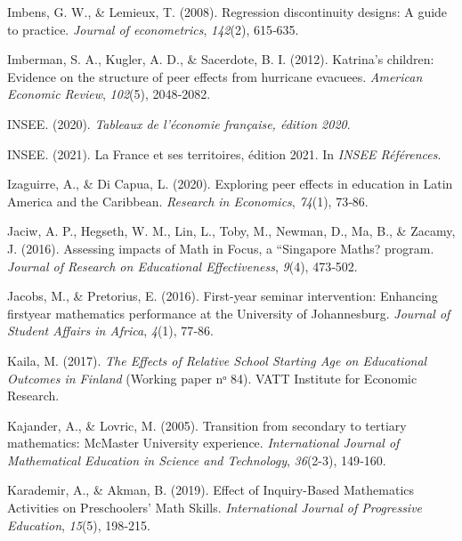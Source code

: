 \documentclass[
]{book}
\newlength{\cslhangindent}
\newlength{\cslentryspacingunit} %
\newenvironment{CSLReferences}[2] %
 {%
  \setlength{\parindent}{0pt}
  \ifodd #1
  \let\oldpar\par
  \def\par{\hangindent=\cslhangindent\oldpar}
  \fi
  \setlength{\parskip}{#2\cslentryspacingunit}
 }%
 {}
\begin{document}
\begin{CSLReferences}{1}{2}
\leavevmode{}%
Imbens, G. W., \& Lemieux, T. (2008). Regression discontinuity designs: A guide to practice. \emph{Journal of econometrics}, \emph{142}(2), 615‑635.

\leavevmode{}%
Imberman, S. A., Kugler, A. D., \& Sacerdote, B. I. (2012). Katrina's children: Evidence on the structure of peer effects from hurricane evacuees. \emph{American Economic Review}, \emph{102}(5), 2048‑2082.

\leavevmode{}%
INSEE. (2020). \emph{Tableaux de l'économie française, édition 2020}.

\leavevmode{}%
INSEE. (2021). La France et ses territoires, édition 2021. In \emph{INSEE Références}.

\leavevmode{}%
Izaguirre, A., \& Di Capua, L. (2020). Exploring peer effects in education in Latin America and the Caribbean. \emph{Research in Economics}, \emph{74}(1), 73‑86.

\leavevmode{}%
Jaciw, A. P., Hegseth, W. M., Lin, L., Toby, M., Newman, D., Ma, B., \& Zacamy, J. (2016). Assessing impacts of Math in Focus, a ``Singapore Maths? program. \emph{Journal of Research on Educational Effectiveness}, \emph{9}(4), 473‑502.

\leavevmode{}%
Jacobs, M., \& Pretorius, E. (2016). First-year seminar intervention: Enhancing firstyear mathematics performance at the University of Johannesburg. \emph{Journal of Student Affairs in Africa}, \emph{4}(1), 77‑86.

\leavevmode{}%
Kaila, M. (2017). \emph{The Effects of Relative School Starting Age on Educational Outcomes in Finland} (Working paper nᵒ 84). VATT Institute for Economic Research.

\leavevmode{}%
Kajander, A., \& Lovric, M. (2005). Transition from secondary to tertiary mathematics: McMaster University experience. \emph{International Journal of Mathematical Education in Science and Technology}, \emph{36}(2-3), 149‑160.

\leavevmode{}%
Karademir, A., \& Akman, B. (2019). Effect of Inquiry-Based Mathematics Activities on Preschoolers' Math Skills. \emph{International Journal of Progressive Education}, \emph{15}(5), 198‑215.


\end{CSLReferences}
\end{document}
